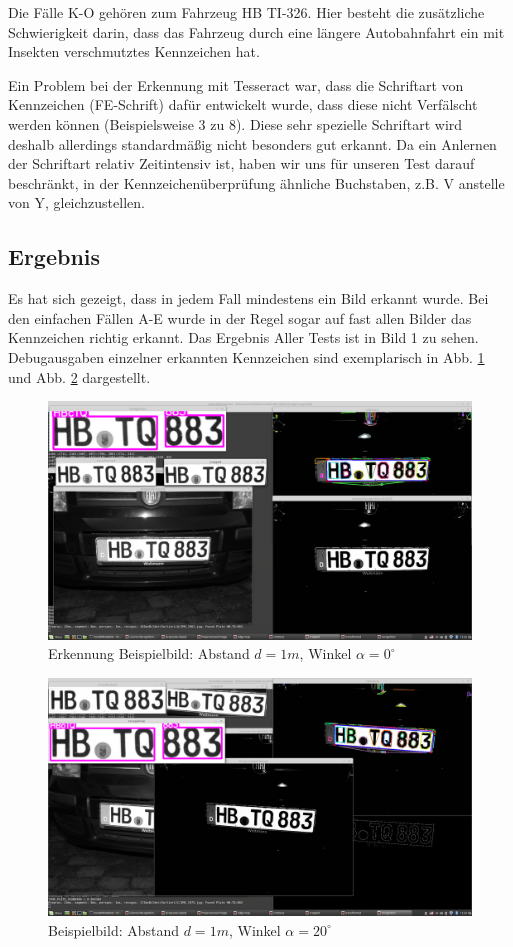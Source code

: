 \documentclass{../Vorlage/sebDenCls}
\begin{document}
Die Fälle K-O gehören zum Fahrzeug HB TI-326. Hier besteht die zusätzliche Schwierigkeit darin, dass das Fahrzeug durch eine längere Autobahnfahrt ein mit Insekten verschmutztes Kennzeichen hat.

Ein Problem bei der Erkennung mit Tesseract war, dass die Schriftart von Kennzeichen (FE-Schrift)  dafür entwickelt wurde, dass diese nicht Verfälscht werden können (Beispielsweise 3 zu 8). Diese sehr spezielle Schriftart wird deshalb allerdings standardmäßig nicht besonders gut erkannt. Da ein Anlernen der Schriftart relativ Zeitintensiv ist, haben wir uns für unseren Test darauf beschränkt, in der Kennzeichenüberprüfung ähnliche Buchstaben, z.B. V anstelle von Y, gleichzustellen.

\subsection{Ergebnis}
Es hat sich gezeigt, dass in jedem Fall mindestens ein Bild erkannt wurde. Bei den einfachen Fällen A-E wurde in der Regel sogar auf fast allen Bilder das Kennzeichen richtig erkannt. Das Ergebnis Aller Tests ist in Bild 1 zu sehen.
Debugausgaben einzelner erkannten Kennzeichen sind exemplarisch in Abb. \ref{beispiel} und Abb. \ref{beispiel2} dargestellt.

\begin{figure}[htp]
	\centering 	
	\includegraphics[width=.9\textwidth]{Funktioniert_1962.png} 
	\caption{Erkennung Beispielbild: Abstand $d=1m$, Winkel $\alpha = 0^\circ$ \label{beispiel}}
\end{figure}

\begin{figure}[htp]
	\centering 	
	\includegraphics[width=.9\textwidth]{Funktioniert_1975.png} 
	\caption{Beispielbild: Abstand $d=1m$, Winkel $\alpha = 20^\circ$ \label{beispiel2}}
\end{figure}
\end{document}
